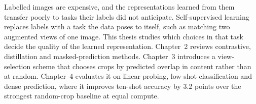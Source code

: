 Labelled images are expensive, and the representations learned from them transfer poorly to
tasks their labels did not anticipate. Self-supervised learning replaces labels with a task the
data poses to itself, such as matching two augmented views of one image. This thesis studies
which choices in that task decide the quality of the learned representation. Chapter~2 reviews
contrastive, distillation and masked-prediction methods. Chapter~3 introduces a view-selection
scheme that chooses crops by predicted overlap in content rather than at random. Chapter~4
evaluates it on linear probing, low-shot classification and dense prediction, where it improves
ten-shot accuracy by 3.2 points over the strongest random-crop baseline at equal compute.
